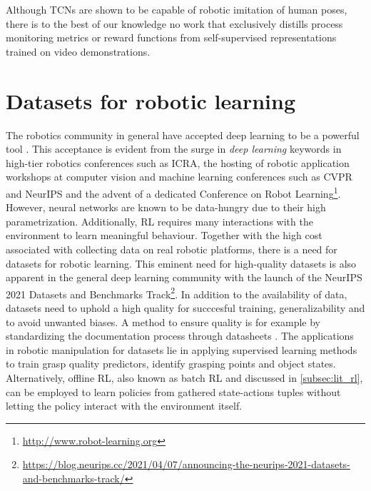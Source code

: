 \documentclass[\home/main.tex]{subfiles}
\begin{document}
Although \glspl{TCN} are shown to be capable of robotic imitation of human poses, there is to the best of our knowledge no work that exclusively distills process monitoring metrics or reward functions from self-supervised representations trained on video demonstrations. %


\section{Datasets for robotic learning} \label{sec:lit_datasets}
The robotics community in general have accepted deep learning to be a powerful tool \autocite{Sunderhauf2018}. This acceptance is evident from the surge in \textit{deep learning} keywords in high-tier robotics conferences such as ICRA, the hosting of robotic application workshops at computer vision and machine learning conferences such as CVPR \autocite{angelova2017computer} and NeurIPS \autocite{Posner2017} and the advent of a dedicated Conference on Robot Learning\footnote{\url{http://www.robot-learning.org}}. However, neural networks are known to be data-hungry due to their high parametrization. Additionally, \gls{RL} requires many interactions with the environment to learn meaningful behaviour. Together with the high cost associated with collecting data on real robotic platforms, there is a need for datasets for robotic learning. This eminent need for high-quality datasets is also apparent in the general deep learning community with the launch of the NeurIPS 2021 Datasets and Benchmarks Track\footnote{\url{https://blog.neurips.cc/2021/04/07/announcing-the-neurips-2021-datasets-and-benchmarks-track/}}. In addition to the availability of data, datasets need to uphold a high quality for succcesful training, generalizability and to avoid unwanted biases. A method to ensure quality is for example by standardizing the documentation process through datasheets \autocite{gebru2018datasheets}.
The applications in robotic manipulation for datasets lie in applying supervised learning methods to train grasp quality predictors, identify grasping points and object states. Alternatively, offline RL, also known as batch RL and discussed in \cref{subsec:lit_rl}, can be employed to learn policies from gathered state-actions tuples without letting the policy interact with the environment itself.
\end{document}
